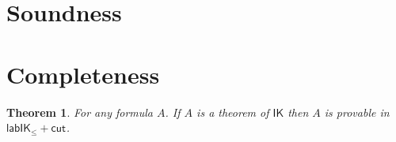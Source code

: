 \documentclass[a4paper]{article}
\theoremstyle{plain}
\newtheorem{theorem}{Theorem}[section]
\theoremstyle{definition}
\newcommand*{\lab}{\mathsf{lab}}
\newcommand*{\IK}{\mathsf{IK}}
\newcommand*{\labIKp}{\lab\IK_{\le}}
\newcommand*{\rn}[1]  {\ensuremath{\mathsf{#1}}}
\newcommand*{\labrn}[2][]  {\rn{#2}_{#1}}%
\begin{document}

\section{Soundness}\label{sec:soundness}


\section{Completeness}\label{sec:completeness}

\begin{theorem}
	For any formula $A$. If $A$ is a theorem of $\IK$ then $A$ is provable in $\labIKp +\labrn{cut}$.
\end{theorem}
\end{document}
